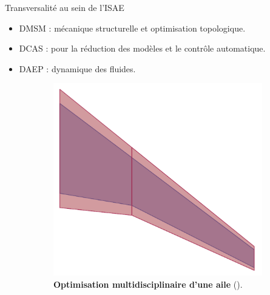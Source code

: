 \documentclass[aspectratio=169, french]{ISAE-Beamer}
\begin{document}
\begin{frame}{Transversalité au sein de l'ISAE}

\begin{itemize}
	\item DMSM : mécanique structurelle et optimisation topologique. 
	\item DCAS : pour la réduction des modèles et le contrôle automatique.
	\item DAEP : dynamique des fluides.
\end{itemize}


\begin{figure}[t]
	\begin{subfigure}[t]{0.45\textwidth}
		\includegraphics[height=.5\textheight]{MDO_wing.pdf}%
		\caption*{\textbf{Optimisation multidisciplinaire d'une aile} (\cite {masColomer2021mdo}). }
	\end{subfigure}\hfill
	\begin{subfigure}[t]{0.45\textwidth}

\end{subfigure}
\end{figure}
\end{frame}
\end{document}
